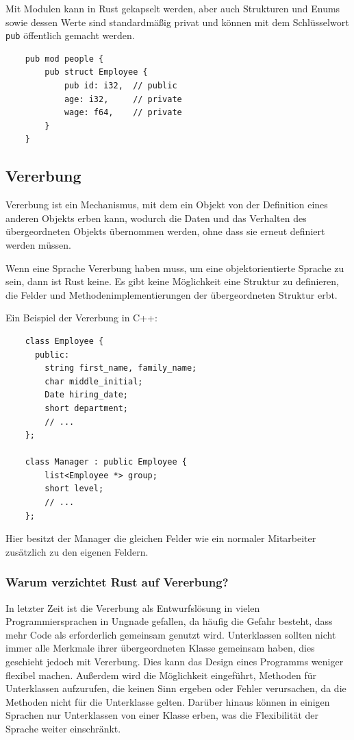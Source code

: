 Mit Modulen kann in Rust gekapselt werden, aber auch Strukturen und Enums sowie dessen Werte sind standardmäßig privat und können mit dem Schlüsselwort \verb"pub" öffentlich gemacht werden.

\begin{lstlisting}
    pub mod people {
        pub struct Employee {
            pub id: i32,  // public
            age: i32,     // private
            wage: f64,    // private
        }
    }
\end{lstlisting}

\subsection{Vererbung}

Vererbung ist ein Mechanismus, mit dem ein Objekt von der Definition eines anderen Objekts erben kann, wodurch die Daten und das Verhalten des über\-ge\-ord\-ne\-ten Objekts übernommen werden, ohne dass sie erneut definiert werden müssen.

Wenn eine Sprache Vererbung haben muss, um eine objektorientierte Sprache zu sein, dann ist Rust keine. Es gibt keine Möglichkeit eine Struktur zu definieren, die Felder und Methodenimplementierungen der übergeordneten Struktur erbt.

Ein Beispiel der Vererbung in C++:

\begin{lstlisting}
    class Employee {
      public:
        string first_name, family_name;
        char middle_initial;
        Date hiring_date;
        short department;
        // ...
    };

    class Manager : public Employee {
        list<Employee *> group;
        short level;
        // ...
    };
\end{lstlisting}

Hier besitzt der Manager die gleichen Felder wie ein normaler Mitarbeiter zu\-sätz\-lich zu den eigenen Feldern.

\subsubsection{Warum verzichtet Rust auf Vererbung?}

In letzter Zeit ist die Vererbung als Entwurfslösung in vielen Programmiersprachen in Ungnade gefallen, da häufig die Gefahr besteht, dass mehr Code als erforderlich gemeinsam genutzt wird. Unterklassen sollten nicht immer alle Merkmale ihrer übergeordneten Klasse gemeinsam haben, dies geschieht jedoch mit Vererbung. Dies kann das Design eines Programms weniger flexibel machen. Außerdem wird die Möglichkeit eingeführt, Methoden für Unterklassen aufzurufen, die keinen Sinn ergeben oder Fehler verursachen, da die Methoden nicht für die Unterklasse gelten. Darüber hinaus können in einigen Sprachen nur Unterklassen von einer Klasse erben, was die Flexibilität der Sprache weiter einschränkt.


